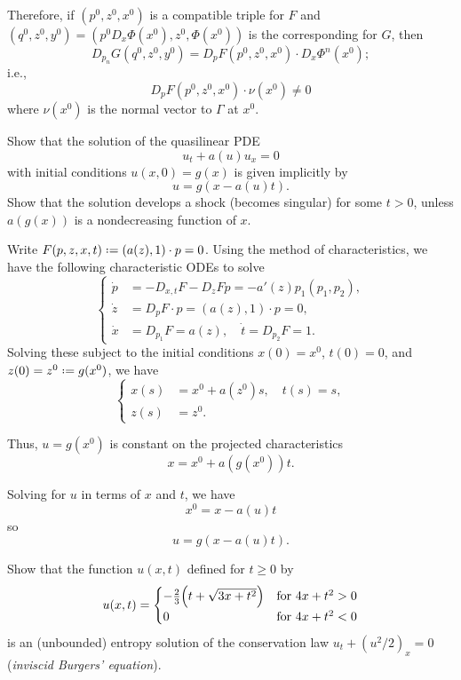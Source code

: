 \begin{solution*}
  Therefore, if \((p^0,z^0,x^0)\) is a compatible triple for \(F\) and
  \((q^0,z^0,y^0)=(p^0D_x\Phi(x^0),z^0,\Phi(x^0))\) is the corresponding
  for \(G\), then
  \[
    D_{p_n}G(q^0,z^0,y^0)=D_pF(p^0,z^0,x^0)\cdot D_x\Phi^n(x^0);
  \]
  i.e.,
  \[
    D_p F(p^0,z^0,x^0)\cdot\nu(x^0)\neq 0
  \]
  where \(\nu(x^0)\) is the normal vector to \(\Gamma\) at \(x^0\).
\end{solution*}

\begin{problem}
  Show that the solution of the quasilinear PDE
  \[
    u_t+a(u)u_x=0
  \]
  with initial conditions \(u(x,0)=g(x)\) is given implicitly by
  \[
    u=g(x-a(u)t).
  \]
  Show that the solution develops a shock (becomes singular) for some
  \(t>0\), unless \(a(g(x))\) is a nondecreasing function of
  \(x\).
\end{problem}
\begin{solution*}
  Write \(F(p,z,x,t)\defeq (a(z),1)\cdot p=0\). Using the method of
  characteristics, we have the following characteristic ODEs to solve
  \[
    \left\{
      \begin{aligned}
        \dot p&=-D_{x,t}F-D_zF p=-a'(z)p_1(p_1,p_2),\\
        \dot z&=D_pF\cdot p=(a(z),1)\cdot p=0,\\
        \dot x&=D_{p_1}F=a(z),\quad \dot t=D_{p_2}F=1.
      \end{aligned}
    \right.
  \]
  Solving these subject to the initial conditions \(x(0)=x^0\), \(t(0)=0\),
  and \(z(0)=z^0\defeq g(x^0)\), we have
  \[
    \left\{
      \begin{aligned}
        x(s)&=x^0+a(z^0)s,\quad t(s)=s,\\
        z(s)&=z^0.
      \end{aligned}
    \right.
  \]

  Thus, \(u=g(x^0)\) is constant on the projected characteristics
  \[
    x=x^0+a(g(x^0))t.
  \]

  Solving for \(u\) in terms of \(x\) and \(t\), we have
  \[
    x^0=x-a(u)t
  \]
  so
  \[
    u=g(x-a(u)t).
  \]
\end{solution*}

\begin{problem}
  Show that the function \(u(x,t)\) defined for \(t\geq 0\) by
  \[
    u(x,t)=
    \begin{cases}
      -\tfrac{2}{3}\Bigl(t+\sqrt{3x+t^2}\Bigr)
      &\text{for \(4x+t^2>0\)}\\
      0
      &\text{for \(4x+t^2<0\)}
    \end{cases}
  \]
  is an (unbounded) entropy solution of the conservation law
  \(u_t+(u^2/2)_x=0\) (\emph{inviscid Burgers' equation}).
\end{problem}
\begin{solution*}
\end{solution*}

